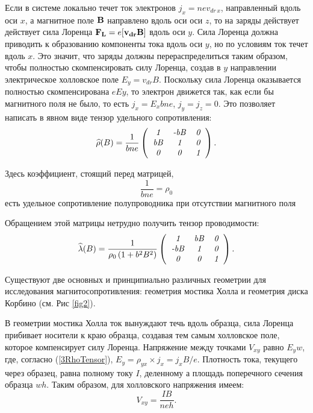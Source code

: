 Если в системе локально течет ток электронов $j_x=nev_{dr\, x}$, направленный вдоль оси $x$, а магнитное поле ${\bf B}$ направлено вдоль оси оси $z$, то на заряды действует действует сила Лоренца ${\bf F_{L}}=e[{\bf v_{dr}B]}$ вдоль оси $y$.
Сила Лоренца должна приводить к образованию компоненты тока вдоль оси $y$, но по условиям ток течет вдоль $x$. Это значит, что заряды должны перераспределиться таким образом, чтобы полностью скомпенсировать силу
Лоренца, создав в $y$ направлении электрическое холловское поле $E_y=v_{dr}B$. Поскольку сила Лоренца
оказывается полностью скомпенсирована $eEy$, то электрон движется так, как если бы магнитного поля не
было, то есть $j_x=E_xbne$, $j_y=j_z=0$. Это позволяет написать в явном виде тензор удельного сопротивления:
\begin{equation}
\widehat{\rho}(B)=\frac{1}{bne} \left(
\begin{tabular}{ccc}
{\it 1} & {\it -bB} & {\it 0} \\
{\it bB} &{\it 1}& {\it 0} \\
{\it 0} &{\it 0}& {\it 1}\\
\end{tabular}
\right).
\label{3RhoTensor}
\end{equation}

Здесь коэффициент, стоящий перед матрицей,
  \begin{equation}
  \frac{1}{bne}=\rho_{0}
      \label{3UdSoprot}
      \end{equation}
есть удельное сопротивление полупроводника при отсутствии магнитного поля 

Обращением этой матрицы нетрудно получить тензор проводимости:
\begin{equation}
\widehat{\lambda}(B)=\frac{1}{\rho_0\left(1+b^2B^2\right)}\left(
\begin{tabular}{ccc}
{\it 1} & {\it bB} & {\it 0} \\
{\it -bB} &{\it 1}& {\it 0} \\
{\it 0} &{\it 0}& {\it 1}\\
\end{tabular}
\right).
\label{3LambdaTensor}
\end{equation}

Существуют две основных и принципиально различных геометрии для исследования магнитосопротивления: геометрия
мостика Холла и геометрия диска Корбино (см. Рис \ref{fig2}).

В геометрии мостика Холла ток вынуждают течь вдоль образца, сила Лоренца прибивает носители к краю образца, создавая тем самым холловское поле, которое компенсирует силу Лоренца. Напряжение между точками $V_{xy}$ равно $E_yw$, где, согласно (\ref{3RhoTensor}), $E_y=\rho_{yx}\times j_x=j_x B/e$. Плотность тока, текущего через образец, равна полному току $I$, деленному а площадь поперечного сечения образца $wh$. Таким образом, для холловского напряжения имеем:
\begin{equation}
V_{xy}=\frac{IB}{neh}.
\label{3HallVoltage}
\end{equation}


